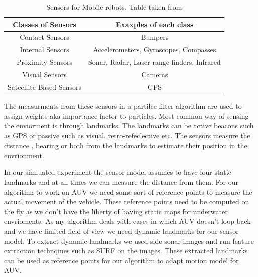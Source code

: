 \documentclass[12pt,draft]{dalcsthesis}
\begin{document}
\begin {table}[tbh]
\begin{tabular}{|c|c|}
\hline 
Classes of Sensors & Exaxples of each class \\ 
\hline 
Contact Sensors & Bumpers \\ 
\hline 
Internal Sensors & Accelerometers, Gyroscopes, Compasses \\ 
\hline 
Proximity Sensors & Sonar, Radar, Laser range-finders, Infrared \\ 
\hline 
Visual Sensors  & Cameras \\ 
\hline 
Sateellite Based Sensors & GPS \\ 
\hline 
\end{tabular}
\caption{\label{tab-: classes of sensors} Sensors for Mobile robots. Table taken from \cite{thrun2005probabilistic}}
\end{table}
The measurments from these sensors in a partilce filter algorithm are used to assign weights aka importance factor to particles. Most common way of sensing the enviorment is through landmarks. The landmarks can be active beacons such as GPS or passive such as visual, retro-refeclective etc. The sensors measure the distance , bearing or both from the landmarks to estimate their position in the envrionment. 

In our simluated experiment the sensor model assumes to have four static landmarks and at all times we can measure the distance from them. For our algorithm to work on AUV we need some sort of reference points to measure the actual movement of the vehicle. These reference points need to be computed on the fly as we don't have the liberty of having static maps for underwater envrioments. As my algorithm deals with cases in which AUV doesn't loop back and we have limited field of view we need dynamic landmarks for our sensor model. To extract dynamic landmarks we used side sonar images and run feature extraction technqiues such as SURF on the images. These extracted landmarks can be used as reference points for our algorithm to adapt motion model for AUV.
\end{document}
